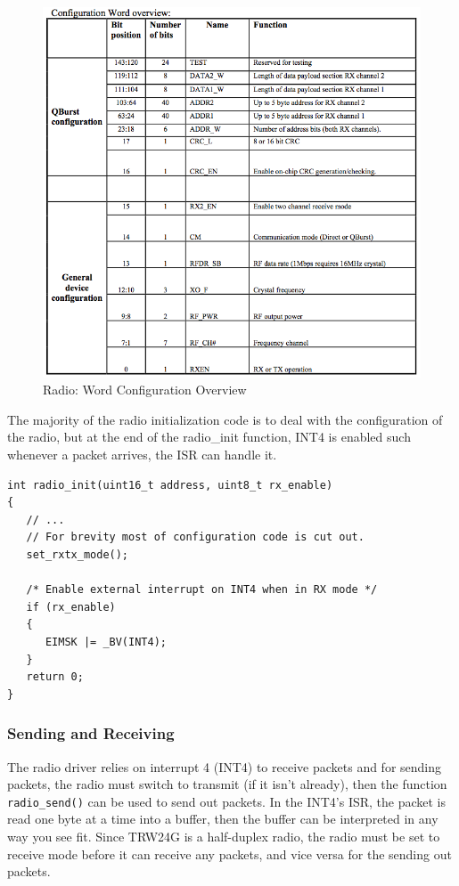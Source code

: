 \begin{figure}[htp]
  \begin{center}
    \includegraphics[width=125mm]{imageSources/radioConfigOverview.png}
  \end{center}
  \caption{Radio: Word Configuration Overview} 
  \label{radioConfigOverview}
\end{figure}

The majority of the radio initialization code is to deal with the configuration of the radio, but at the end of the radio\_init function, INT4 is enabled such whenever a packet arrives, the ISR can handle it.

\begin{lstlisting}
int radio_init(uint16_t address, uint8_t rx_enable)
{
   // ...
   // For brevity most of configuration code is cut out.
   set_rxtx_mode();

   /* Enable external interrupt on INT4 when in RX mode */
   if (rx_enable)
   {
      EIMSK |= _BV(INT4);
   }
   return 0;
}
\end{lstlisting}

\subsubsection{Sending and Receiving}
The radio driver relies on interrupt 4 (INT4) to receive packets and for sending packets, the radio must switch to transmit (if it isn't already), then the function \texttt{radio\_send()} can be used to send out packets. In the INT4's ISR, the packet is read one byte at a time into a buffer, then the buffer can be interpreted in any way you see fit. Since TRW24G is a half-duplex radio, the radio must be set to receive mode before it can receive any packets, and vice versa for the sending out packets.

